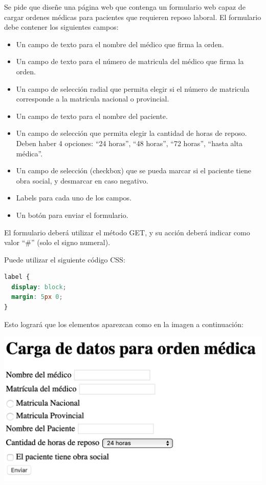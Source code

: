 \begin{exercise}
Se pide que diseñe una página web que contenga un formulario web capaz de
cargar ordenes médicas para pacientes que requieren reposo laboral. El 
formulario debe contener los siguientes campos:
\begin{itemize}
  \item Un campo de texto para el nombre del médico que firma la orden.
  \item Un campo de texto para el número de matricula del médico que firma la orden.
  \item Un campo de selección radial que permita elegir si el número de
    matricula corresponde a la matricula nacional o provincial.
  \item Un campo de texto para el nombre del paciente.
  \item Un campo de selección que permita elegir la cantidad de horas de reposo.
    Deben haber 4 opciones: ``24 horas'', ``48 horas'', ``72 horas'', ``hasta alta médica''.
  \item Un campo de selección (checkbox) que se pueda marcar si el paciente
    tiene obra social, y desmarcar en caso negativo.
  \item Labels para cada uno de los campos.
  \item Un botón para enviar el formulario.
\end{itemize}
El formulario deberá utilizar el método GET, y su acción deberá indicar como
valor ``\#'' (solo el signo numeral).

Puede utilizar el siguiente código CSS:
\begin{adjustwidth}{25pt}{10pt}
  \begin{lstlisting}[language=CSS]
label {
  display: block;
  margin: 5px 0;
}
  \end{lstlisting}
\end{adjustwidth}
Esto logrará que los elementos aparezcan como en la imagen a continuación:

\includegraphics[scale=0.65]{anexos/html/imagenes/formulario_1.png}
\end{exercise}


